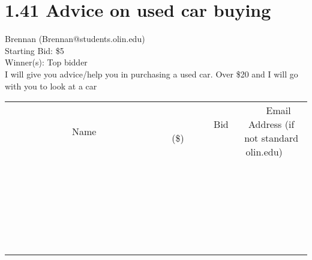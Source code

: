 \documentclass[11pt]{article}
\begin{document}
\section*{1.41 Advice on used car buying}
Brennan (Brennan@students.olin.edu) \\
Starting Bid: \$5 \\
Winner(s): 
Top bidder \\
I will give you advice/help you in purchasing a used car. Over \$20 and I will go with you to look at a car \\[6ex]
\begin{tabular}{c c c}
~~~~~~~~~~~~~Name~~~~~~~~~~~~~ & ~~~~~~~~~Bid (\$)~~~~~~~~~ & ~~~Email Address (if not standard olin.edu)~~~ \\
 & & \\
\hline
 & & \\
\hline
 & & \\
\hline
 & & \\
\hline
 & & \\
\hline
 & & \\
\hline
 & & \\
\hline
 & & \\
\hline
 & & \\
\hline
 & & \\
\hline
 & & \\
\hline
 & & \\
\hline
 & & \\
\hline
 & & \\
\hline
 & & \\
\hline
 & & \\
\hline
 & & \\
\hline
 & & \\
\hline
 & & \\
\hline
 & & \\
\hline
 & & \\
\hline
 & & \\
\hline
 & & \\
\hline
 & & \\
\hline
 & & \\
\hline
 & & \\
\hline
\end{tabular}
\clearpage
\end{document}
